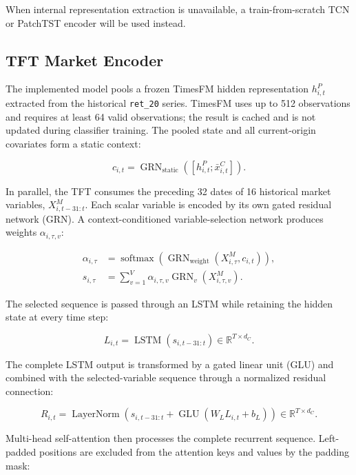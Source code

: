\documentclass[11pt]{article}
\newcommand{\R}{\mathbb{R}}
\newcommand{\softmax}{\operatorname{softmax}}
\begin{document}
When internal representation extraction is unavailable, a train-from-scratch
TCN or PatchTST encoder will be used instead.

\subsection{TFT Market Encoder}

The implemented model pools a frozen TimesFM hidden representation
$h^P_{i,t}$ extracted from the historical \texttt{ret\_20} series. TimesFM
uses up to 512 observations and requires at least 64 valid observations; the
result is cached and is not updated during classifier training. The pooled
state and all current-origin covariates form a static context:

\begin{equation}
c_{i,t}
=
\operatorname{GRN}_{\mathrm{static}}
\left([h^P_{i,t};\bar x^C_{i,t}]\right).
\end{equation}

In parallel, the TFT consumes the preceding 32 dates of 16 historical market
variables, $X^M_{i,t-31:t}$. Each scalar variable is encoded by its own gated
residual network (GRN). A context-conditioned variable-selection network
produces weights $\alpha_{i,\tau,v}$:

\begin{align}
\alpha_{i,\tau}
&=
\softmax\!\left(
\operatorname{GRN}_{\mathrm{weight}}
(X^M_{i,\tau},c_{i,t})
\right),\\
s_{i,\tau}
&=
\sum_{v=1}^{V}
\alpha_{i,\tau,v}
\operatorname{GRN}_{v}(X^M_{i,\tau,v}).
\end{align}

The selected sequence is passed through an LSTM while retaining the hidden
state at every time step:

\begin{equation}
L_{i,t}
=
\operatorname{LSTM}(s_{i,t-31:t})
\in\R^{T\times d_C}.
\end{equation}

The complete LSTM output is transformed by a gated linear unit (GLU) and
combined with the selected-variable sequence through a normalized residual
connection:

\begin{equation}
R_{i,t}
=
\operatorname{LayerNorm}
\left(
s_{i,t-31:t}
+
\operatorname{GLU}(W_L L_{i,t}+b_L)
\right)
\in\R^{T\times d_C}.
\end{equation}

Multi-head self-attention then processes the complete recurrent sequence.
Left-padded positions are excluded from the attention keys and values by the
padding mask:
\end{document}
